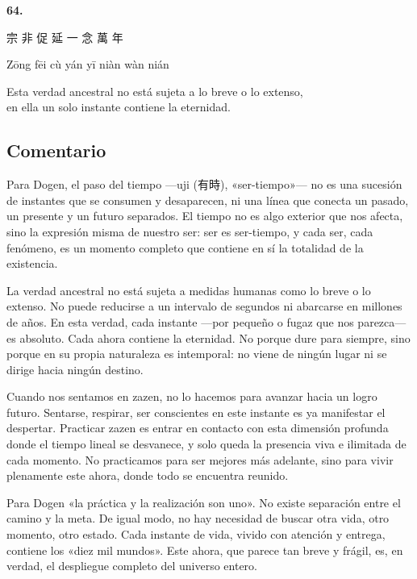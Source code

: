 \documentclass[
  a5paperpaper,
]{article}
\begin{document}
\hfill\break

\hypertarget{04}{}
\begin{verseblock}

\newpage

\begin{center}\textbf{64.}\end{center}

宗 非 促 延 一 念 萬 年

Zōng fēi cù yán yī niàn wàn nián

Esta verdad ancestral no está sujeta a lo breve o lo extenso,\\
en ella un solo instante contiene la eternidad.

\end{verseblock}

\hfill\break

\hypertarget{comentario-63}{%
\subsection{Comentario}\label{comentario-63}}

Para Dogen, el paso del tiempo ---uji (有時), «ser-tiempo»--- no es una
sucesión de instantes que se consumen y desaparecen, ni una línea que
conecta un pasado, un presente y un futuro separados. El tiempo no es
algo exterior que nos afecta, sino la expresión misma de nuestro ser:
ser es ser-tiempo, y cada ser, cada fenómeno, es un momento completo que
contiene en sí la totalidad de la existencia.

La verdad ancestral no está sujeta a medidas humanas como lo breve o lo
extenso. No puede reducirse a un intervalo de segundos ni abarcarse en
millones de años. En esta verdad, cada instante ---por pequeño o fugaz
que nos parezca--- es absoluto. Cada ahora contiene la eternidad. No
porque dure para siempre, sino porque en su propia naturaleza es
intemporal: no viene de ningún lugar ni se dirige hacia ningún destino.

Cuando nos sentamos en zazen, no lo hacemos para avanzar hacia un logro
futuro. Sentarse, respirar, ser conscientes en este instante es ya
manifestar el despertar. Practicar zazen es entrar en contacto con esta
dimensión profunda donde el tiempo lineal se desvanece, y solo queda la
presencia viva e ilimitada de cada momento. No practicamos para ser
mejores más adelante, sino para vivir plenamente este ahora, donde todo
se encuentra reunido.

Para Dogen «la práctica y la realización son uno». No existe separación
entre el camino y la meta. De igual modo, no hay necesidad de buscar
otra vida, otro momento, otro estado. Cada instante de vida, vivido con
atención y entrega, contiene los «diez mil mundos». Este ahora, que
parece tan breve y frágil, es, en verdad, el despliegue completo del
universo entero.
\end{document}
